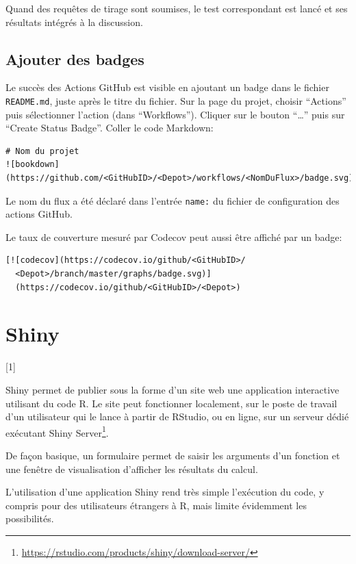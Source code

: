\documentclass[
  12pt,
  french,
  a4paper,
  extrafontsizes,onecolumn,openright
  ]{memoir}
\newcommand{\toc}[1]{%
  \startcontents[chapters]%
  \printcontents[chapters]{}{1}[#1]{}%
  ~\newline%
}
\begin{document}
Quand des requêtes de tirage sont soumises, le test correspondant est lancé et ses résultats intégrés à la discussion.

\section{Ajouter des badges}\label{sec:ci-badges}

Le succès des Actions GitHub est visible en ajoutant un badge dans le fichier \texttt{README.md}, juste après le titre du fichier.
Sur la page du projet, choisir \enquote{Actions} puis sélectionner l'action (dans \enquote{Workflows}).
Cliquer sur le bouton \enquote{\ldots{}} puis sur \enquote{Create Status Badge}.
Coller le code Markdown:

\begin{verbatim}
# Nom du projet
![bookdown](https://github.com/<GitHubID>/<Depot>/workflows/<NomDuFlux>/badge.svg)
\end{verbatim}

Le nom du flux a été déclaré dans l'entrée \texttt{name:} du fichier de configuration des actions GitHub.

Le taux de couverture mesuré par Codecov peut aussi être affiché par un badge:

\begin{verbatim}
[![codecov](https://codecov.io/github/<GitHubID>/
  <Depot>/branch/master/graphs/badge.svg)]
  (https://codecov.io/github/<GitHubID>/<Depot>)
\end{verbatim}

\chapter{Shiny}\label{chap-shiny}

\toc{1}

Shiny permet de publier sous la forme d'un site web une application interactive utilisant du code R.
Le site peut fonctionner localement, sur le poste de travail d'un utilisateur qui le lance à partir de RStudio, ou en ligne, sur un serveur dédié exécutant Shiny Server\footnote{\url{https://rstudio.com/products/shiny/download-server/}}.

De façon basique, un formulaire permet de saisir les arguments d'un fonction et une fenêtre de visualisation d'afficher les résultats du calcul.

L'utilisation d'une application Shiny rend très simple l'exécution du code, y compris pour des utilisateurs étrangers à R, mais limite évidemment les possibilités.
\end{document}
